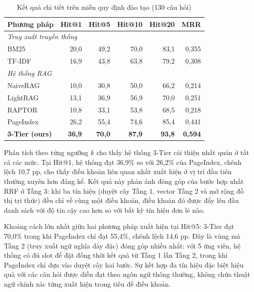\begin{table}[htbp]
  \centering
  \caption{Kết quả chi tiết trên miền quy định đào tạo (130 câu hỏi)}
  \label{tab:hit-daotao-chitiet}
  \begin{tabular}{lrrrrr}
    \toprule
    \textbf{Phương pháp} & \textbf{Hit@1} & \textbf{Hit@5} & \textbf{Hit@10} & \textbf{Hit@20} & \textbf{MRR} \\
    \midrule
    \multicolumn{6}{l}{\textit{Truy xuất truyền thống}} \\
    BM25      & 20{,}0 & 49{,}2 & 70{,}0 & 83{,}1 & 0{,}355 \\
    TF-IDF    & 16{,}9 & 43{,}8 & 63{,}8 & 79{,}2 & 0{,}308 \\
    \multicolumn{6}{l}{\textit{Hệ thống RAG}} \\
    NaiveRAG  & 10{,}0 & 30{,}8 & 50{,}0 & 66{,}2 & 0{,}214 \\
    LightRAG  & 13{,}1 & 36{,}9 & 56{,}9 & 70{,}0 & 0{,}251 \\
    RAPTOR    & 10{,}8 & 33{,}1 & 53{,}8 & 68{,}5 & 0{,}218 \\
    PageIndex & 26{,}2 & 55{,}4 & 74{,}6 & 85{,}4 & 0{,}441 \\
    \textbf{3-Tier (ours)} & \textbf{36{,}9} & \textbf{70{,}0} & \textbf{87{,}9} & \textbf{93{,}8} & \textbf{0{,}594} \\
    \bottomrule
  \end{tabular}
\end{table}

Phân tích theo từng ngưỡng $k$ cho thấy hệ thống 3-Tier cải thiện nhất quán ở tất cả các
mức. Tại Hit@1, hệ thống đạt 36,9\% so với 26,2\% của PageIndex, chênh lệch 10,7 pp,
cho thấy điều khoản liên quan nhất xuất hiện ở vị trí đầu tiên thường xuyên hơn đáng
kể. Kết quả này phản ánh đóng góp của bước hợp nhất RRF ở Tầng 3: khi ba tín hiệu
(duyệt cây Tầng 1, vector Tầng 2 và mở rộng đồ thị tri thức) đều chỉ về cùng một điều
khoản, điều khoản đó được đẩy lên đầu danh sách với độ tin cậy cao hơn so với bất kỳ
tín hiệu đơn lẻ nào.

Khoảng cách lớn nhất giữa hai phương pháp xuất hiện tại Hit@5: 3-Tier đạt 70,0\% trong
khi PageIndex chỉ đạt 55,4\%, chênh lệch 14,6 pp. Đây là vùng mà Tầng 2 (truy xuất ngữ
nghĩa dày đặc) đóng góp nhiều nhất: với 5 ứng viên, hệ thống có đủ slot để đặt đồng
thời kết quả từ Tầng 1 lẫn Tầng 2, trong khi PageIndex chỉ dựa vào duyệt cây hai bước.
Sự kết hợp đa tín hiệu đặc biệt hiệu quả với các câu hỏi được diễn đạt theo ngôn ngữ
thông thường, không chứa thuật ngữ chính xác từng xuất hiện trong tiêu đề điều khoản.


